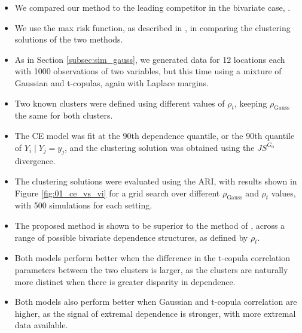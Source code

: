 \documentclass{article}
\numberwithin{equation}{section}
\begin{document}
\begin{itemize}
  \item We compared our method to the leading competitor in the bivariate case, \citet{Vignotto2021}.
  \item We use the max risk function, as described in \citet{Vignotto2021}, in comparing the clustering solutions of the two methods.
  \item As in Section \ref{subsec:sim_gauss}, we generated data for 12 locations each with 1000 observations of two variables, but this time using a mixture of Gaussian and t-copulas, again with Laplace margins. 
  \item Two known clusters were defined using different values of $\rho_t$, keeping $\rho_{\text{Gauss}}$ the same for both clusters. %
  \item The CE model was fit at the 90th dependence quantile, or the 90th quantile of $Y_{i} \mid Y_{j} = y_j$, and the clustering solution was obtained using the $JS^{G_{\alpha}}$ divergence.
  \item The clustering solutions were evaluated using the ARI, with results shown in Figure \ref{fig:01_ce_vs_vi} for a grid search over different $\rho_{\text{Gauss}}$ and $\rho_{t}$ values, with 500 simulations for each setting.
  \item The proposed method is shown to be superior to the method of \cite{Vignotto2021}, across a range of possible bivariate dependence structures, as defined by $\rho_t$.
  \item Both models perform better when the difference in the t-copula correlation parameters between the two clusters is larger, as the clusters are naturally more distinct when there is greater disparity in dependence.
  \item Both models also perform better when Gaussian and t-copula correlation are higher, as the signal of extremal dependence is stronger, with more extremal data available.
\end{itemize}
\end{document}
